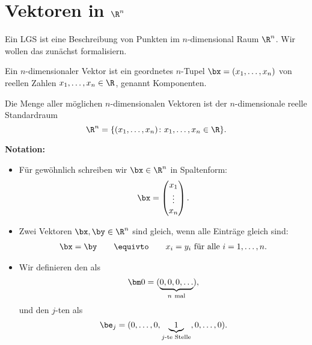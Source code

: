 

\section{Vektoren in \texorpdfstring{$\R^n$}{Rn}}  \label{sec:vektorrechnung}

Ein LGS ist eine Beschreibung von Punkten im $n$-dimensional Raum $\R^n$. Wir wollen das zunächst formalisiern.
\begin{definition}
	Ein $n$-dimensionaler Vektor ist ein geordnetes $n$-Tupel $\bx = (x_1, \dots, x_n)$ von reellen Zahlen $x_1, \dots, x_n \in \R$, genannt Komponenten.
\end{definition}

\begin{definition}
	Die Menge aller möglichen $n$-dimensionalen Vektoren ist der $n$-dimensionale reelle Standardraum
	$$ \R^n = \{(x_1, \dots, x_n)\colon x_1, \dots, x_n \in \R \}.$$
\end{definition}

\noindent \textbf{Notation:}
\begin{itemize}
	\item Für gewöhnlich schreiben wir $\bx \in \R^n$ in Spaltenform:
	      $$ \bx = \begin{pmatrix}
			      x_1 \\ \vdots \\ x_n
		      \end{pmatrix}.$$
	\item Zwei Vektoren $\bx, \by \in \R^n$ sind gleich, wenn alle Einträge gleich sind:
	      \begin{align*}
		      \bx = \by \qquad \equivto \qquad  x_i = y_i \mbox{ für alle } i = 1, \dots, n.
	      \end{align*}
	\item 	Wir definieren den  als
	      $$\bm 0 = (\underbrace{0, 0, 0, \dots}_{n \mbox{ \scriptsize{mal}}}),$$
	      und den $j$-ten  als
	      $$\be_j = (0, \dots, 0, \underbrace{1}_{j\mbox{\scriptsize{-te Stelle}}}, 0, \dots, 0).$$
\end{itemize}

